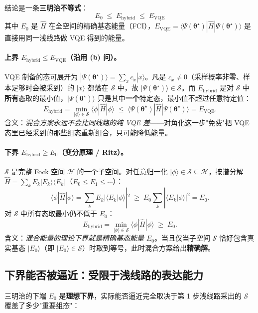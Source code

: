 \documentclass[11pt,a4paper]{article}
\begin{document}
结论是一条\textbf{三明治不等式}：
$$\boxed{\,E_0 \;\leq\; E_{\text{hybrid}} \;\leq\; E_{\text{VQE}}\,}$$
其中 $E_0$ 是 $\hat{H}$ 在全空间的精确基态能量（FCI），$E_{\text{VQE}} = \langle\Psi(\boldsymbol\theta^\star)|\hat{H}|\Psi(\boldsymbol\theta^\star)\rangle$ 是直接用同一浅线路做 VQE 得到的能量。

\paragraph{上界 $E_{\text{hybrid}} \leq E_{\text{VQE}}$（沿用 (b) 问）。}
VQE 制备的态可展开为 $|\Psi(\boldsymbol\theta^\star)\rangle = \sum_x c_x |x\rangle$。凡是 $c_x \neq 0$（采样概率非零、样本足够时会被采到）的 $|x\rangle$ 都落在 $\mathcal{S}$ 中，故 $|\Psi(\boldsymbol\theta^\star)\rangle \in \mathcal{S}$。而 $E_{\text{hybrid}}$ 是对 $\mathcal{S}$ 中\textbf{所有}态取的最小值，$|\Psi(\boldsymbol\theta^\star)\rangle$ 只是其中\textbf{一个}特定态，最小值不超过任意特定值：
$$E_{\text{hybrid}} = \min_{|\phi\rangle \in \mathcal{S}} \langle\phi|\hat{H}|\phi\rangle \;\leq\; \langle\Psi(\boldsymbol\theta^\star)|\hat{H}|\Psi(\boldsymbol\theta^\star)\rangle = E_{\text{VQE}}.$$
含义：\emph{混合方案永远不会比同线路的纯 VQE 差}——对角化这一步"免费"把 VQE 态里已经采到的那些组态重新组合，只可能降低能量。

\paragraph{下界 $E_{\text{hybrid}} \geq E_0$（变分原理 / Ritz）。}
$\mathcal{S}$ 是完整 Fock 空间 $\mathcal{H}$ 的一个子空间。对任意归一化 $|\phi\rangle \in \mathcal{S} \subseteq \mathcal{H}$，按谱分解 $\hat{H} = \sum_k E_k |E_k\rangle\langle E_k|$（$E_0 \leq E_1 \leq \cdots$）：
$$\langle\phi|\hat{H}|\phi\rangle = \sum_k E_k |\langle E_k|\phi\rangle|^2 \;\geq\; E_0 \sum_k |\langle E_k|\phi\rangle|^2 = E_0.$$
对 $\mathcal{S}$ 中所有态取最小仍不低于 $E_0$：
$$E_{\text{hybrid}} = \min_{|\phi\rangle \in \mathcal{S}} \langle\phi|\hat{H}|\phi\rangle \;\geq\; E_0.$$
含义：\emph{混合能量的理论下界就是精确基态能量 $E_0$}。当且仅当子空间 $\mathcal{S}$ 恰好包含真实基态 $|E_0\rangle$（即 $|E_0\rangle \in \mathcal{S}$）时取到等号，此时混合方案给出\textbf{精确解}。

\subsection*{下界能否被逼近：受限于浅线路的表达能力}

三明治的下端 $E_0$ 是\textbf{理想下界}，实际能否逼近完全取决于第 1 步浅线路采出的 $\mathcal{S}$ 覆盖了多少"重要组态"：
\end{document}
